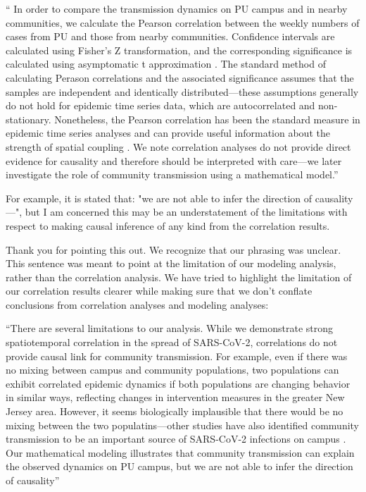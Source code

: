 \documentclass[12pt]{article}
\newcommand{\revtext}{\textsf}
\begin{document}
``
In order to compare the transmission dynamics on PU campus and in nearby communities, we calculate the Pearson correlation between the weekly numbers of cases from PU and those from nearby communities.
Confidence intervals are calculated using Fisher's Z transformation, and the corresponding significance is calculated using asymptomatic t approximation \citep{hollander2013nonparametric}.
The standard method of calculating Perason correlations and the associated significance assumes that the samples are independent and identically distributed---these assumptions generally do not hold for epidemic time series data, which are autocorrelated and non-stationary.
Nonetheless, the Pearson correlation has been the standard measure in epidemic time series analyses and can provide useful information about the strength of spatial coupling \citep{rohani1999opposite,grenfell2001travelling,viboud2006synchrony,baker2019epidemic}.
We note correlation analyses do not provide direct evidence for causality and therefore should be interpreted with care---we later investigate the role of community transmission using a mathematical model.''

\revtext{For example, it is stated that: "we are not able to infer the direction of causality—", but I am concerned this may be an understatement of the limitations with respect to making causal inference of any kind from the correlation results.}

Thank you for pointing this out.
We recognize that our phrasing was unclear. 
This sentence was meant to point at the limitation of our modeling analysis, rather than the correlation analysis.
We have tried to highlight the limitation of our correlation results clearer while making sure that we don't conflate conclusions from correlation analyses and modeling analyses:

``There are several limitations to our analysis.
While we demonstrate strong spatiotemporal correlation in the spread of SARS-CoV-2, correlations do not provide causal link for community transmission.
For example, even if there was no mixing between campus and community populations, two populations can exhibit correlated epidemic dynamics if both populations are changing behavior in similar ways, reflecting changes in intervention measures in the greater New Jersey area.
However, it seems biologically implausible that there would be no mixing between the two populatins---other studies have also identified community transmission to be an important source of SARS-CoV-2 infections on campus \citep{fox2021response,hamer2021assessment}.
Our mathematical modeling illustrates that community transmission can explain the observed dynamics on PU campus, but we are not able to infer the direction of causality''
\end{document}
